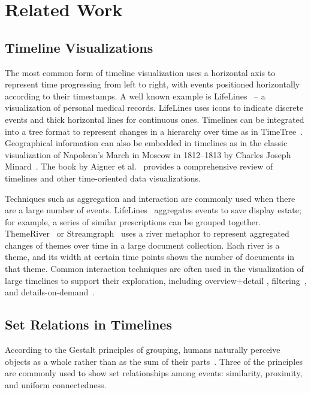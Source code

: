 \section{Related Work}

\subsection{Timeline Visualizations}
The most common form of timeline visualization uses a horizontal axis to represent time progressing from left to right, with events positioned horizontally according to their timestamps. A well known example is LifeLines~\cite{Plaisant1998} -- a visualization of personal medical records. LifeLines uses icons to indicate discrete events and thick horizontal lines for continuous ones. Timelines can be integrated into a tree format to represent changes in a hierarchy over time as in TimeTree~\cite{Card2006}. Geographical information can also be embedded in timelines as in the classic visualization of Napoleon's March in Moscow in 1812--1813 by Charles Joseph Minard~\cite{Minard1869}. The book by Aigner et al.~\cite{Aigner2011} provides a comprehensive review of timelines and other time-oriented data visualizations.

Techniques such as aggregation and interaction are commonly used when there are a large number of events. LifeLines~\cite{Plaisant1998} aggregates events to save display estate; for example, a series of similar prescriptions can be grouped together. ThemeRiver~\cite{Havre2002} or Streamgraph~\cite{Byron2008} uses a river metaphor to represent aggregated changes of themes over time in a large document collection. Each river is a theme, and its width at certain time points shows the number of documents in that theme. Common interaction techniques are often used in the visualization of large timelines to support their exploration, including overview+detail \cite{Andre2007},  filtering~\cite{Plaisant1996a}, and details-on-demand~\cite{Stab2010}.

\subsection{Set Relations in Timelines}
According to the Gestalt principles of grouping, humans naturally perceive objects as a whole rather than as the sum of their parts~\cite{Koffka1935}. Three of the principles are commonly used to show set relationships among events: similarity, proximity, and uniform connectedness.

